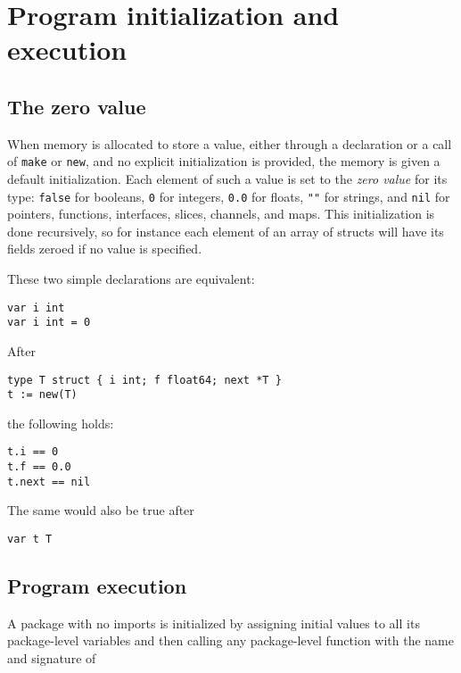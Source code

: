 \section*{Program initialization and execution}

\subsection*{The zero value}

When memory is allocated to store a value, either through a declaration
or a call of \texttt{make} or \texttt{new}, and no explicit
initialization is provided, the memory is given a default
initialization. Each element of such a value is set to the \emph{zero
value} for its type: \texttt{false} for booleans, \texttt{0} for
integers, \texttt{0.0} for floats, \texttt{""} for strings, and
\texttt{nil} for pointers, functions, interfaces, slices, channels, and
maps. This initialization is done recursively, so for instance each
element of an array of structs will have its fields zeroed if no value
is specified.

These two simple declarations are equivalent:

\begin{Verbatim}[frame=single]
var i int
var i int = 0
\end{Verbatim}

After

\begin{Verbatim}[frame=single]
type T struct { i int; f float64; next *T }
t := new(T)
\end{Verbatim}

the following holds:

\begin{Verbatim}[frame=single]
t.i == 0
t.f == 0.0
t.next == nil
\end{Verbatim}

The same would also be true after

\begin{Verbatim}[frame=single]
var t T
\end{Verbatim}

\subsection*{Program execution}

A package with no imports is initialized by assigning initial values to
all its package-level variables and then calling any package-level
function with the name and signature of

